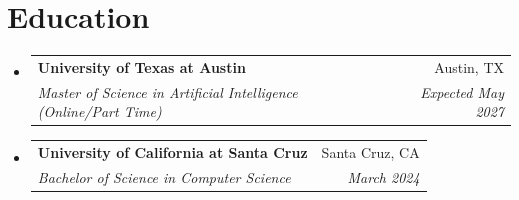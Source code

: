 \documentclass[letterpaper,11pt]{article}
\makeatletter
\newcommand{\resumeSubheading}[4]{
  \vspace{-2pt}\item
    \begin{tabular*}{0.97\textwidth}[t]{l@{\extracolsep{\fill}}r}
      \textbf{#1} & #2 \\
      \textit{\small#3} & \textit{\small #4} \\
    \end{tabular*}\vspace{-7pt}
}
\newcommand{\resumeSubHeadingListStart}{\begin{itemize}[leftmargin=0.15in, label={}]}
\newcommand{\resumeSubHeadingListEnd}{\end{itemize}}
\makeatother
\begin{document}
\section{Education}
  \resumeSubHeadingListStart
    \resumeSubheading
      {University of Texas at Austin}{Austin, TX}
      {Master of Science in Artificial Intelligence (Online/Part Time)}{Expected May 2027}
    \resumeSubheading
      {University of California at Santa Cruz}{Santa Cruz, CA}
      {Bachelor of Science in Computer Science}{March 2024}
  \resumeSubHeadingListEnd

\end{document}
